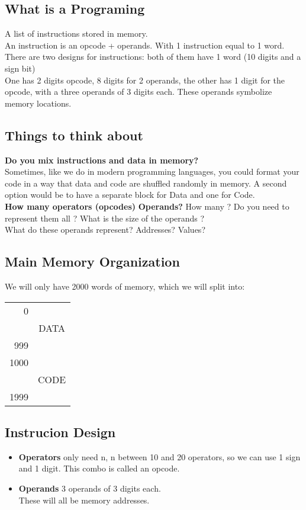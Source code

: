      \subsection{What is a Programing}
     A list of instructions stored in memory.\\
     An instruction is an opcode + operands. With 1 instruction equal to 1 word.\\
     There are two designs for instructions: both of them have 1 word (10 digits and a sign bit)\\
     One has 2 digits opcode, 8 digits for 2 operands, the other has 1 digit for the opcode, with a three operands of 3 digits each. These operands symbolize memory locations.\\
     \subsection{Things to think about}
     \textbf{Do you mix instructions and data in memory?}\\
     Sometimes, like we do in modern programming languages, you could format your code in a way that data and code are shuffled randomly in memory. A second option would be to have a separate block for Data and one for Code.\\
     \textbf{How many operators (opcodes)}
     \textbf{Operands?}
     How many ? Do you need to represent them all ? What is the size of the operands ?\\
     What do these operands represent? Addresses? Values?\\
     \subsection{Main Memory Organization}
     We will only have 2000 words of memory, which we will split into:
     \begin{center}
        \begin{tabular}{r|c|}
            0 & \\
            & DATA \\
            999 & \\
            \hline
            1000 & \\
            & CODE \\
            1999 & \\
        \end{tabular}
     \end{center}
     \subsection{Instrucion Design}
     \begin{itemize}
        \item \textbf{Operators} only need n, n between 10 and 20 operators, so we can use 1 sign and 1 digit. This combo is called an opcode.\\
        \item \textbf{Operands} 3 operands of 3 digits each.\\
        These will all be memory addresses.\\
     \end{itemize}
